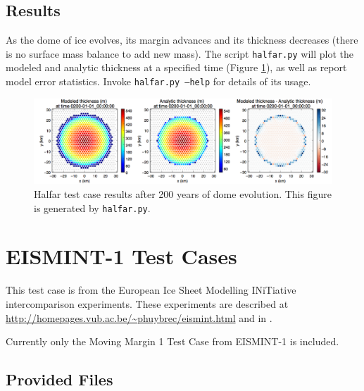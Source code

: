 \subsection{Results}
\label{subsecc:halfar_results}
As the dome of ice evolves, its margin advances and its thickness decreases (there is no surface mass balance to add new mass).  The script \texttt{halfar.py} will plot the modeled and analytic thickness at a specified time (Figure \ref{fig:halfarresults}), as well as report model error statistics.  Invoke \texttt{halfar.py --help} for details of its usage.


\begin{figure}[H!]
	\centering
	\includegraphics[width=16.4cm]{landice/figures/halfar.png}
	\caption{Halfar test case results after 200 years of dome evolution. This figure is generated by \texttt{halfar.py}.}
	\label{fig:halfarresults}
\end{figure}


\FloatBarrier


\section{EISMINT-1 Test Cases}
\label{sec:eismint_description}
This test case is from the European Ice Sheet Modelling INiTiative intercomparison experiments.  These experiments are described at \url{http://homepages.vub.ac.be/~phuybrec/eismint.html} and in \citet{Huybrechts1996}.

Currently only the Moving Margin 1 Test Case from EISMINT-1 is included.


\subsection{Provided Files}
\label{subsec:eismint_files}


